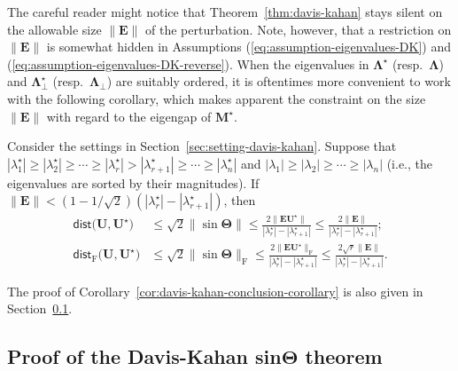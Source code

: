The careful reader might notice that Theorem~\ref{thm:davis-kahan}  stays silent on the allowable size $\|\bm{E}\|$ of the perturbation.  Note, however, that a restriction on $\|\bm{E}\|$ is somewhat hidden in Assumptions (\ref{eq:assumption-eigenvalues-DK}) and (\ref{eq:assumption-eigenvalues-DK-reverse}).
When the eigenvalues in $\bm{\Lambda}^{\star}$ (resp.~$\bm{\Lambda}$) and $\bm{\Lambda}^{\star}_{\perp}$ (resp.~$\bm{\Lambda}_{\perp}$) are suitably ordered,
it is oftentimes more convenient to work with the following corollary, which makes apparent the constraint on the  size $\|\bm{E}\|$ with regard to the eigengap of $\bm{M}^{\star}$.
%
\begin{corollary}
\label{cor:davis-kahan-conclusion-corollary}
	Consider the settings in Section~\ref{sec:setting-davis-kahan}. Suppose that $|\lambda_1^{\star} | \geq |\lambda_2^{\star} | \geq \cdots \geq  |\lambda_r^{\star} | >  |\lambda_{r+1}^{\star} | \geq \cdots \geq |\lambda_n^{\star}|$ and $|\lambda_1 | \geq |\lambda_2 | \geq \cdots \geq |\lambda_n|$ (i.e., the eigenvalues are sorted by their magnitudes).
If $\|\bm{E}\|< (1-1/\sqrt{2}) (|\lambda_{r}^{\star}|-|\lambda_{r+1}^{\star}|)$, then
%
\begin{subequations}
\label{eq:davis-kahan-conclusion-corollary}
\begin{align}
\mathsf{dist}\big(\bm{U},\bm{U}^{\star}\big) & \leq\sqrt{2}\|\sin\bm{\Theta}\|\leq\frac{2 \big\|\bm{E}\bm{U}^{\star}\big\|}{|\lambda_{r}^{\star}|-|\lambda_{r+1}^{\star}|}\leq\frac{2\|\bm{E}\|}{|\lambda_{r}^{\star}|-|\lambda_{r+1}^{\star}|};\\
	\mathsf{dist}_{\mathrm{F}}\big(\bm{U},\bm{U}^{\star}\big) & \leq\sqrt{2}\|\sin\bm{\Theta}\|_{\mathrm{F}}\leq\frac{2 \big\|\bm{E}\bm{U}^{\star}\big\|_{\mathrm{F}}}{|\lambda_{r}^{\star}|-|\lambda_{r+1}^{\star}|}\leq\frac{2\sqrt{r}\|\bm{E}\|}{|\lambda_{r}^{\star}|-|\lambda_{r+1}^{\star}|}.
\end{align}
\end{subequations}
%
\end{corollary}
%
The proof of Corollary~\ref{cor:davis-kahan-conclusion-corollary} is also given in Section~\ref{subsection2.2.4}. 








\subsection{Proof of the Davis-Kahan \texorpdfstring{sin$\bm{\Theta}$}{TEXT} theorem}\label{subsection2.2.4}



